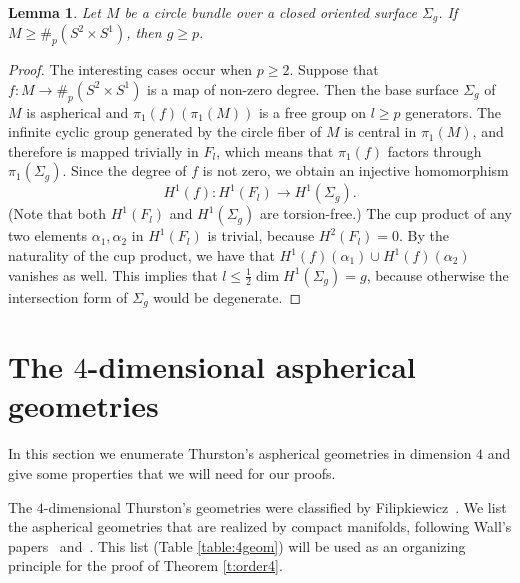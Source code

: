 \documentclass[12pt]{amsart}
\newtheorem{lem}[thm]{Lemma}
\theoremstyle{remark}
\begin{document}
\begin{lem}\label{l:sharpgenus}
 Let $M$ be a circle bundle over a closed oriented surface $\Sigma_g$. If $M\geq\#_p (S^2 \times S^1)$, then $g \geq p$. 
\end{lem}
\begin{proof}
 The interesting cases occur when $p \geq 2$. Suppose that $f \colon M \longrightarrow \#_p (S^2 \times S^1)$ is a map of non-zero degree. Then 
the base surface $\Sigma_g$ of $M$ is aspherical and $\pi_1(f)(\pi_1(M))$ is a free group on $l \geq p$ generators. The infinite cyclic group generated by
the circle fiber of $M$ is central in $\pi_1(M)$, and therefore is mapped trivially in $F_l$, which means that $\pi_1(f)$ factors through
$\pi_1(\Sigma_g)$. Since the degree of $f$ is not zero, we obtain
an injective homomorphism 
\[
 H^1(f) \colon H^1(F_l) \longrightarrow H^1(\Sigma_g).
\]
(Note that both $H^1(F_l)$ and $H^1(\Sigma_g)$ are torsion-free.) The cup product of any two elements $\alpha_1,\alpha_2$ in $H^1(F_l)$ is trivial, because
$H^2(F_l) = 0$. By the naturality of the cup product, we have that $H^1(f)(\alpha_1) \cup H^1(f)(\alpha_2)$ vanishes as well.
This implies that $l \leq \frac{1}{2} \dim H^1(\Sigma_g) = g$, because otherwise the intersection form of $\Sigma_g$ would be degenerate.
\end{proof}

 \section{The $4$-dimensional aspherical geometries}\label{s:4-geom}
  
In this section we enumerate Thurston's aspherical geometries in dimension $4$ and give some properties that we will need for our proofs.

The $4$-dimensional Thurston's geometries were classified by Filipkiewicz~\cite{Filipkiewicz}. We list the aspherical geometries that are realized by compact manifolds, following Wall's papers~\cite{Wall:geom4-mfds1} and~\cite{Wall:geom4-mfds2}. 
This list (Table \ref{table:4geom}) will be used as an organizing principle for the proof of Theorem \ref{t:order4}.
\end{document}
